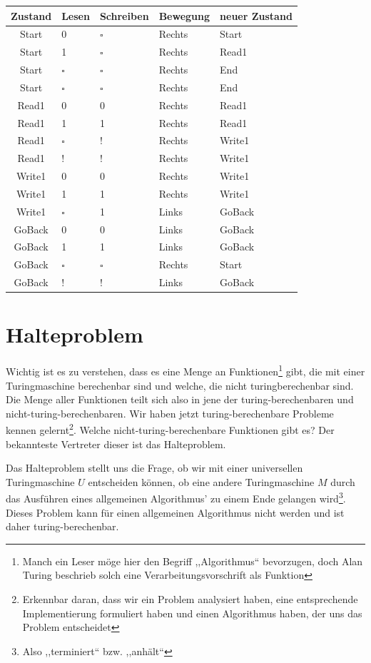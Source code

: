 \begin{table}
 \begin{center}
  \begin{tabular}{cllll}
   \hline
    Zustand & Lesen     & Schreiben & Bewegung & neuer Zustand \\
   \hline \hline
    Start   & 0         & $\square$ & Rechts   & Start \\
    Start   & 1         & $\square$ & Rechts   & Read1 \\
    Start   & $\square$ & $\square$ & Rechts   & End \\
    Start   & $\square$ & $\square$ & Rechts   & End \\
    Read1   & 0         & 0         & Rechts   & Read1 \\
    Read1   & 1         & 1         & Rechts   & Read1 \\
    Read1   & $\square$ & !         & Rechts   & Write1 \\
    Read1   & !         & !         & Rechts   & Write1 \\
    Write1  & 0         & 0         & Rechts   & Write1 \\
    Write1  & 1         & 1         & Rechts   & Write1 \\
    Write1  & $\square$ & 1         & Links    & GoBack \\
    GoBack  & 0         & 0         & Links    & GoBack \\
    GoBack  & 1         & 1         & Links    & GoBack \\
    GoBack  & $\square$ & $\square$ & Rechts   & Start \\
    GoBack  & !         & !         & Links    & GoBack \\
   \hline
  \end{tabular}
 \end{center}
\end{table}
%
\section{Halteproblem}
%
Wichtig ist es zu verstehen, dass es eine Menge an Funktionen\footnote{Manch ein Leser möge hier den Begriff ,,Algorithmus`` bevorzugen, doch Alan Turing beschrieb solch eine Verarbeitungsvorschrift als Funktion} gibt, die mit einer Turingmaschine berechenbar sind und welche, die nicht turingberechenbar sind. Die Menge aller Funktionen teilt sich also in jene der turing-berechenbaren und nicht-turing-berechenbaren. Wir haben jetzt turing-berechenbare Probleme kennen gelernt\footnote{Erkennbar daran, dass wir ein Problem analysiert haben, eine entsprechende Implementierung formuliert haben und einen Algorithmus haben, der uns das Problem entscheidet}. Welche nicht-turing-berechenbare Funktionen gibt es? Der bekannteste Vertreter dieser ist das Halteproblem.

Das Halteproblem stellt uns die Frage, ob wir mit einer universellen Turingmaschine $U$ entscheiden können, ob eine andere Turingmaschine $M$ durch das Ausführen eines allgemeinen Algorithmus' zu einem Ende gelangen wird\footnote{Also ,,terminiert`` bzw. ,,anhält``}. Dieses Problem kann für einen allgemeinen Algorithmus nicht werden und ist daher turing-berechenbar.
